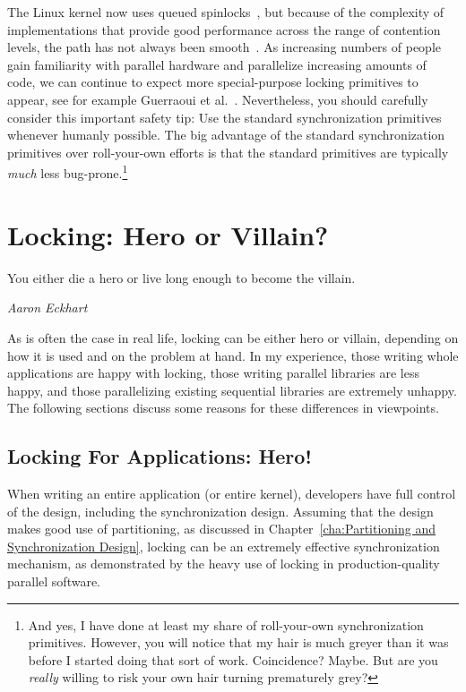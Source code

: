 The Linux kernel now uses queued spinlocks~\cite{JonathanCorbet2014qspinlocks},
but because of the complexity of implementations that provide good
performance across the range of contention levels, the path has not
always been smooth~\cite{CatalinMarinas2018qspinlockTLA,WillDeacon2018qspinlock}.
As increasing numbers of people gain familiarity with parallel hardware
and parallelize increasing amounts of code, we can continue to expect more
special-purpose locking primitives to appear, see for example Guerraoui et
al.~\cite{Guerraoui:2019:LPA:3319851.3301501,HugoGuirouxPhD}.
Nevertheless, you should carefully consider this important safety tip:
Use the standard synchronization primitives whenever humanly possible.
The big advantage of the standard synchronization primitives over
roll-your-own efforts is that the standard primitives are typically
\emph{much} less bug-prone.\footnote{
	And yes, I have done at least my share of roll-your-own
	synchronization primitives.
	However, you will notice that my hair is much greyer than
	it was before I started doing that sort of work.
	Coincidence?
	Maybe.
	But are you \emph{really} willing to risk your own hair turning
	prematurely grey?}



\section{Locking: Hero or Villain?}
\label{sec:locking:Locking: Hero or Villain?}
%
\epigraph{You either die a hero or live long enough to become the villain.}
	 {\emph{Aaron Eckhart}}

As is often the case in real life, locking can be either hero or villain,
depending on how it is used and on the problem at hand.
In my experience, those writing whole applications are happy with
locking, those writing parallel libraries are less happy, and those
parallelizing existing sequential libraries are extremely unhappy.
The following sections discuss some reasons for these differences in
viewpoints.

\subsection{Locking For Applications: Hero!}
\label{sec:locking:Locking For Applications: Hero!}

When writing an entire application (or entire kernel), developers have
full control of the design, including the synchronization design.
Assuming that the design makes good use of partitioning, as discussed in
Chapter~\ref{cha:Partitioning and Synchronization Design}, locking
can be an extremely effective synchronization mechanism, as demonstrated
by the heavy use of locking in production-quality parallel software.

